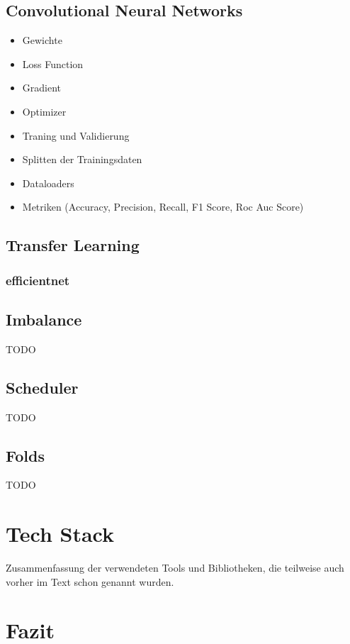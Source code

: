 \documentclass[11pt, a4paper]{article}
\begin{document}
\tableofcontents
\thispagestyle{empty}
\newpage

\subsection{Convolutional Neural Networks}

\begin{itemize}
	\item Gewichte
	\item Loss Function
	\item Gradient
	\item Optimizer
	\item Traning und Validierung
	\item Splitten der Trainingsdaten
	\item Dataloaders
	\item Metriken (Accuracy, Precision, Recall, F1 Score, Roc Auc Score)
\end{itemize}

\subsection{Transfer Learning}

\subsubsection{efficientnet}

\subsection{Imbalance}
TODO

\subsection{Scheduler}
TODO

\subsection{Folds}
TODO

\section{Tech Stack}
Zusammenfassung der verwendeten Tools und Bibliotheken, die teilweise auch vorher im Text schon genannt wurden.

\section{Fazit}
\end{document}

